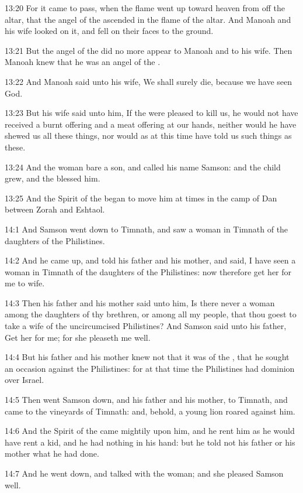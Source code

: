13:20 For it came to pass, when the flame went up toward heaven from
off the altar, that the angel of the \LORD ascended in the flame of the
altar. And Manoah and his wife looked on it, and fell on their faces
to the ground.

13:21 But the angel of the \LORD did no more appear to Manoah and to
his wife. Then Manoah knew that he was an angel of the \LORD.

13:22 And Manoah said unto his wife, We shall surely die, because we
have seen God.

13:23 But his wife said unto him, If the \LORD were pleased to kill us,
he would not have received a burnt offering and a meat offering at our
hands, neither would he have shewed us all these things, nor would as
at this time have told us such things as these.

13:24 And the woman bare a son, and called his name Samson: and the
child grew, and the \LORD blessed him.

13:25 And the Spirit of the \LORD began to move him at times in the
camp of Dan between Zorah and Eshtaol.

14:1 And Samson went down to Timnath, and saw a woman in Timnath of
the daughters of the Philistines.

14:2 And he came up, and told his father and his mother, and said, I
have seen a woman in Timnath of the daughters of the Philistines: now
therefore get her for me to wife.

14:3 Then his father and his mother said unto him, Is there never a
woman among the daughters of thy brethren, or among all my people,
that thou goest to take a wife of the uncircumcised Philistines? And
Samson said unto his father, Get her for me; for she pleaseth me well.

14:4 But his father and his mother knew not that it was of the \LORD,
that he sought an occasion against the Philistines: for at that time
the Philistines had dominion over Israel.

14:5 Then went Samson down, and his father and his mother, to Timnath,
and came to the vineyards of Timnath: and, behold, a young lion roared
against him.

14:6 And the Spirit of the \LORD came mightily upon him, and he rent
him as he would have rent a kid, and he had nothing in his hand: but
he told not his father or his mother what he had done.

14:7 And he went down, and talked with the woman; and she pleased
Samson well.

